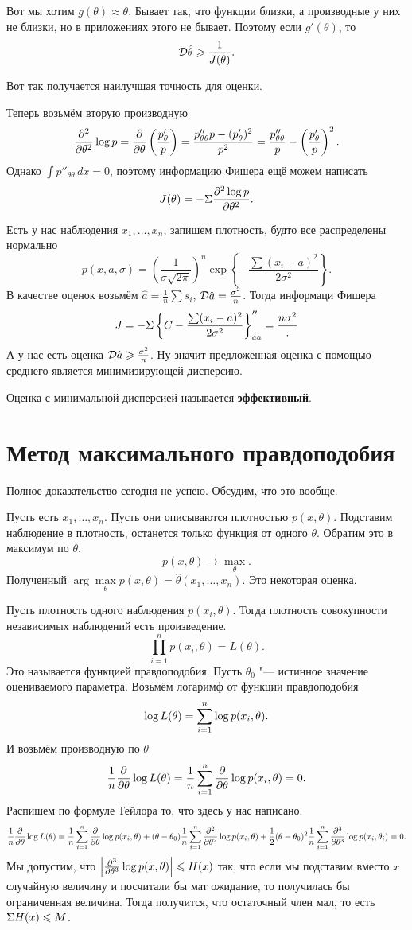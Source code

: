 Вот мы хотим $g(\theta)\approx \theta$. Бывает так, что функции близки, а производные у них не близки, но в приложениях этого не бывает. Поэтому если $g'(\theta)$, то
\[
  \mathcal D\hat\theta \geqslant \frac1{J(\theta)}.
\]

Вот так получается наилучшая точность для оценки.




Теперь возьмём вторую производную
\[
  \frac{\partial ^2}{\partial \theta^2}\log p = \frac{\partial  }{\partial \theta}\left( \frac{p'_\theta}{p} \right) = \frac{p''_{\theta\theta} p - (p'_\theta)^2}{p^2} = \frac{p''_{\theta\theta}}p - \left( \frac{p'_\theta}{p} \right)^2.
\]
Однако $\int p''_{\theta\theta}\,dx = 0$, поэтому информацию Фишера ещё можем написать
\[
  J(\theta) = -\Sigma \frac{\partial ^2\log p}{\partial \theta^2}.
\]

Есть у нас наблюдения $x_1,\dots,x_n$, запишем плотность, будто все распределены нормально
\[
  p(x,a,\sigma) = \left( \frac{1}{\sigma\sqrt{2\pi}} \right)^n \exp\left\{ -\frac{\sum(x_i-a)^2}{2 \sigma^2} \right\}.
\]
В качестве оценок возьмём $\hat a = \frac1n \sum s_i$, $\mathcal D \hat a = \frac{\sigma^2}n$. Тогда информаци Фишера
\[
   J = -\Sigma\left\{ C - \frac{ \sum (x_i-a)^2}{2\sigma^2} \right\}''_{aa} = \frac{n\sigma^2}.
\]
А у нас есть оценка $\mathcal D\hat a\geqslant \frac{\sigma^2}n$. Ну значит предложенная оценка с помощью среднего является минимизирующей дисперсию.

Оценка с минимальной дисперсией называется \textbf{эффективный}.

\section{Метод максимального правдоподобия}
Полное доказательство сегодня не успею. Обсудим, что это вообще.

Пусть есть $x_1,\dots,x_n$. Пусть они описываются плотностью $p(x,\theta)$. Подставим наблюдение в плотность, останется только функция от одного $\theta$. Обратим это в максимум по $\theta$.
\[
  p(x,\theta)\to\max\limits_\theta.
\]
Полученный $\arg\max\limits_\theta p(x,\theta) = \hat\theta(x_1,\dots,x_n)$. Это некоторая оценка.

Пусть плотность одного наблюдения $p(x_i,\theta)$. Тогда плотность совокупности независимых наблюдений есть произведение.
\[
  \prod\limits_{i=1}^n p(x_i,\theta) = L(\theta).
\]
Это называется функцией правдоподобия. Пусть $\theta_0$ "--- истинное значение оцениваемого параметра. Возьмём логаримф от функции правдоподобия
\[
  \log L(\theta) = \sum\limits_{i = 1}^{n}\log p(x_i,\theta). 
\]
И возьмём производную по $\theta$
\[
  \frac1n\frac{\partial  }{\partial \theta} \log L(\theta) = \frac1n \sum\limits_{i = 1}^{n}\frac{\partial  }{\partial \theta}\log p(x_i,\theta) = 0.
\]
Распишем по формуле Тейлора то, что здесь у нас написано.
\[
  \frac1n\frac{\partial  }{\partial \theta}\log L(\theta) = \frac 1n \sum\limits_{i = 1}^{n}\frac{\partial  }{\partial \theta}\log p(x_i,\theta) + (\theta-\theta_0)\frac1n\sum\limits_{i = 1}^{n}\frac{\partial ^2}{\partial \theta^2}\log p(x_i,\theta) + 
  \frac12 (\theta-\theta_0)^2 \frac1n \sum\limits_{i = 1}^{n}\frac{\partial ^3}{\partial \theta^3}\log p(x_i,\theta_i) = 0.
\]
Мы допустим, что $\left|\frac{\partial ^3}{\partial \theta^3}\log p(x,\theta)\right|\leqslant H(x)$ так, что если мы подставим вместо $x$ случайную величину и посчитали бы мат ожидание, то получилась бы ограниченная величина. Тогда получится, что остаточный член мал, то есть $\Sigma H(x)\leqslant M$.

